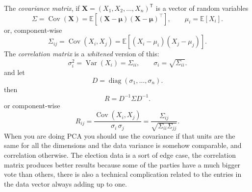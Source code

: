 \documentclass[12pt]{article}
\begin{document}
The \emph{covariance matrix}, if $\mathbf{X}=(X_1,X_2,\ldots,X_n)^{\mathsf T}$ is a vector of random variables
\begin{equation}
\Sigma
= \operatorname{Cov}(\mathbf{X})
= \mathbb{E}\!\left[(\mathbf{X}-\boldsymbol{\mu})(\mathbf{X}-\boldsymbol{\mu})^\top\right],
\qquad
\mu_i = \mathbb{E}[X_i].
\end{equation}
or, component-wise
\begin{equation} 
\Sigma_{ij} = \operatorname{Cov}(X_i,X_j)
= \mathbb{E}\!\left[(X_i-\mu_i)(X_j-\mu_j)\right].
\end{equation}
The \emph{correlation matrix} is a \emph{whitened} version of this:
\begin{equation}
\sigma_i^2 = \operatorname{Var}(X_i) = \Sigma_{ii},
\qquad
\sigma_i = \sqrt{\Sigma_{ii}}.
\end{equation}
and let
\begin{equation}
  D = \operatorname{diag}(\sigma_1,\dots,\sigma_n).
\end{equation}
then
\begin{equation}
R = D^{-1}\Sigma D^{-1}.
\end{equation}
or component-wise
\begin{equation}
R_{ij}
= \frac{\operatorname{Cov}(X_i,X_j)}{\sigma_i\,\sigma_j}
= \frac{\Sigma_{ij}}{\sqrt{\Sigma_{ii}\Sigma_{jj}}}.
\end{equation}
When you are doing PCA you should use the covariance if that units are
the same for all the dimensions and the data variance is somehow
comparable, and correlation otherwise. The election data is a sort of
edge case, the correlation matrix produces better results because some
of the parties have a much bigger vote than others, there is also a
technical complication related to the entries in the data vector
always adding up to one.
\end{document}

